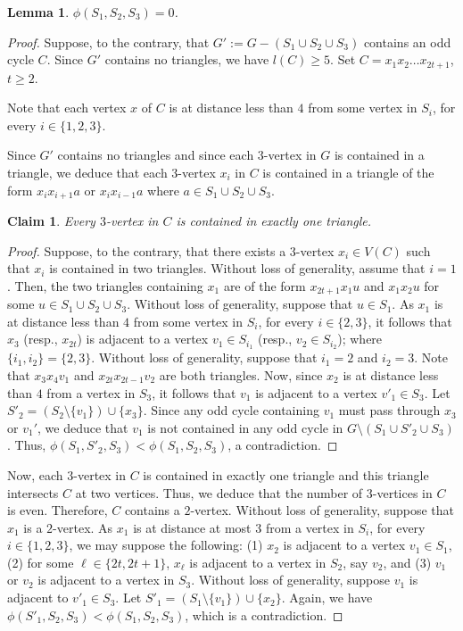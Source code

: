 \documentclass[12pt, oneside]{scrartcl}
\newtheorem{lemma}{Lemma}%
\newtheorem{claim}{Claim}[section]
\begin{document}
\begin{lemma}\label{l11}
    $\phi(S_1,S_2,S_3)=0$.
\end{lemma}
\begin{proof}
    Suppose, to the contrary, that $G' := G- (S_1\cup S_2\cup S_3)$ contains an odd cycle $C$. Since $G'$ contains no triangles, we have $l(C) \ge 5$. Set $C = x_1 x_2 \ldots x_{2t+1}$, $t\geq 2$.  

    Note that each vertex $x$ of $C$ is at distance less than $4$ from some vertex in $S_i$, for every $i\in \{1,2,3\}$.

    Since $G'$ contains no triangles and since each $3$-vertex in $G$ is contained in a triangle, we deduce that each $3$-vertex $x_i$ in $C$ is contained in a triangle of the form $x_ix_{i+1}a$ or $x_ix_{i-1}a$ where $a\in S_1\cup S_2\cup S_3$.

    \begin{claim}
    Every $3$-vertex in $C$ is contained in exactly one triangle.
    \end{claim}
    \begin{proof}
    Suppose, to the contrary, that there exists a $3$-vertex $x_i\in V(C)$ such that $x_i$ is contained in two triangles. Without loss of generality, assume that $i=1$. Then, the two triangles containing $x_1$ are of the form $x_{2t+1}x_1u$ and $x_1x_2u$ for some $u\in S_1\cup S_2\cup S_3$. Without loss of generality, suppose that $u\in S_1$. As $x_1$ is at distance less than $4$ from some vertex in $S_i$, for every $i\in \{2,3\}$, it follows that $x_3$ (resp., $x_{2t}$) is adjacent to a vertex $v_1\in S_{i_1}$ (resp., $v_2\in S_{i_2}$); where $\{i_1,i_2\}=\{2,3\}$. Without loss of generality, suppose that $i_1=2$ and $i_2=3$. Note that $x_3x_4v_1$ and $x_{2t}x_{2t-1}v_2$ are both triangles. Now, since $x_2$ is at distance less than $4$ from a vertex in $S_3$, it follows that $v_1$ is adjacent to a vertex $v'_1\in S_3$. Let $S'_2=(S_2\setminus \{v_1\})\cup \{x_3\}$. Since any odd cycle containing $v_1$ must pass through $x_3$ or $v_1'$, we deduce that $v_1$ is not contained in any odd cycle in $G\setminus(S_1\cup S'_2\cup S_3)$. Thus, $\phi(S_1,S'_2,S_3)<\phi(S_1,S_2,S_3)$, a contradiction.
    \end{proof}

    Now, each $3$-vertex in $C$ is contained in exactly one triangle and this triangle intersects $C$ at two vertices. Thus, we deduce that the number of $3$-vertices in $C$ is even. Therefore, $C$ contains a $2$-vertex. Without loss of generality, suppose that $x_1$ is a $2$-vertex. As $x_1$ is at distance at most $3$ from a vertex in $S_i$, for every $i\in \{1,2,3\}$, we may suppose the following: (1) $x_2$ is adjacent to a vertex $v_1\in S_1$, (2) for some $\ell\in \{2t,2t+1\}$, $x_{\ell}$ is adjacent to a vertex in $S_2$, say $v_2$, and (3) $v_1$ or $v_2$ is adjacent to a vertex in $S_3$. Without loss of generality, suppose $v_1$ is adjacent to $v'_1\in S_3$. Let $S'_1=(S_1\setminus \{v_1\})\cup \{x_2\}$. Again, we have $\phi(S'_1,S_2,S_3)<\phi(S_1,S_2,S_3)$, which is a contradiction.  
\end{proof}
\end{document}
